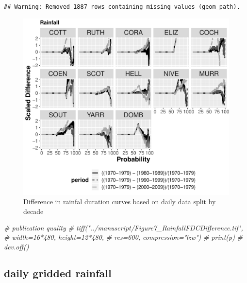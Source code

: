 \documentclass[]{article}
\newenvironment{Shaded}{\begin{snugshade}}{\end{snugshade}}
\newcommand{\CommentTok}[1]{\textcolor[rgb]{0.56,0.35,0.01}{\textit{{#1}}}}
\begin{document}
\begin{verbatim}
## Warning: Removed 1887 rows containing missing values (geom_path).
\end{verbatim}

\begin{figure}[htbp]
\centering
\includegraphics{4.FDC_Analysis_files/figure-latex/FDC_rain-1.pdf}
\caption{Difference in rainfal duration curves based on daily data split
by decade}
\end{figure}

\begin{Shaded}
\begin{Highlighting}[]
\CommentTok{# publication quality}
\CommentTok{# tiff("../manuscript/Figure7_RainfallFDCDifference.tif",}
\CommentTok{#      width=16*480, height=12*480,}
\CommentTok{#      res=600, compression="lzw")}
\CommentTok{# print(p)}
\CommentTok{# dev.off()}
\end{Highlighting}
\end{Shaded}

\subsection{daily gridded rainfall}\label{daily-gridded-rainfall}
\end{document}
